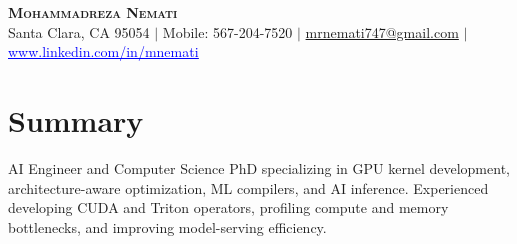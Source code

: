 \documentclass[letterpaper,13pt]{article}
\begin{document}
\begin{center}
    \textbf{\LARGE \scshape Mohammadreza Nemati} \\ \vspace{1pt}
    \small Santa Clara, CA 95054 $|$ Mobile: 567-204-7520 $|$
    \href{mailto:mrnemati747@gmail.com}{mrnemati747@gmail.com} $|$
    \href{https://www.linkedin.com/in/mnemati/}{\textcolor{blue}{\underline{www.linkedin.com/in/mnemati}}}
\end{center}

\section{Summary}
\small{AI Engineer and Computer Science PhD specializing in GPU kernel development, architecture-aware optimization, ML compilers, and AI inference. Experienced developing CUDA and Triton operators, profiling compute and memory bottlenecks, and improving model-serving efficiency.}
\vspace{0.05cm}
\end{document}
